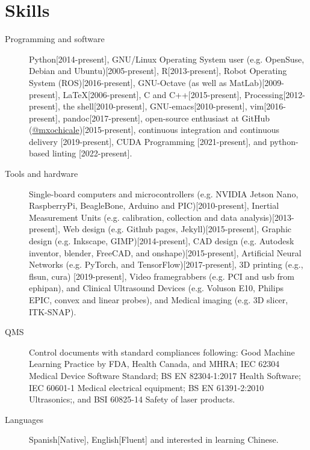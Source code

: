 \documentclass{mycv}
\begin{document}
\section{Skills}
\begin{description}

\item[Programming and software] Python[2014-present],
GNU/Linux Operating System user (e.g. OpenSuse, Debian and Ubuntu)[2005-present], 
R[2013-present], 
Robot Operating System (ROS)[2016-present],
GNU-Octave (as well as MatLab)[2009-present],
\LaTeX [2006-present], 
C and C++[2015-present],
Processing[2012-present], 
the shell[2010-present], 
GNU-emacs[2010-present],
vim[2016-present], 
pandoc[2017-present],
open-source enthusiast at GitHub (\href{https://github.com/mxochicale}{@mxochicale})[2015-present], 
continuous integration and continuous delivery [2019-present], 
CUDA Programming [2021-present], and
python-based linting [2022-present].

\item[Tools and hardware] 
Single-board computers and microcontrollers (e.g. NVIDIA Jetson Nano, RaspberryPi, BeagleBone, Arduino and PIC)[2010-present],
Inertial Measurement Units (e.g. calibration, collection and data analysis)[2013-present], 
Web design (e.g. Github pages, Jekyll)[2015-present], 
Graphic design (e.g. Inkscape, GIMP)[2014-present],
CAD design (e.g. Autodesk inventor, blender, FreeCAD, and onshape)[2015-present], 
Artificial Neural Networks (e.g. PyTorch, and TensorFlow)[2017-present], 
3D printing (e.g., flsun, cura) [2019-present], 
Video framegrabbers (e.g. PCI and usb from ephipan), and 
Clinical Ultrasound Devices (e.g. Voluson E10, Philips EPIC, convex and linear probes), and 
Medical imaging (e.g. 3D slicer, ITK-SNAP).

\item[QMS] 
Control documents with standard compliances following:
Good Machine Learning Practice by FDA, Health Canada, and MHRA;
IEC 62304 Medical Device Software Standard;
BS EN 82304-1:2017 Health Software;
IEC 60601-1 Medical electrical equipment; 
BS EN 61391-2:2010 Ultrasonics;, and
BSI 60825-14 Safety of laser products.

\item[Languages] Spanish[Native], English[Fluent] and interested in learning Chinese.
 
\end{description}

\end{document}
